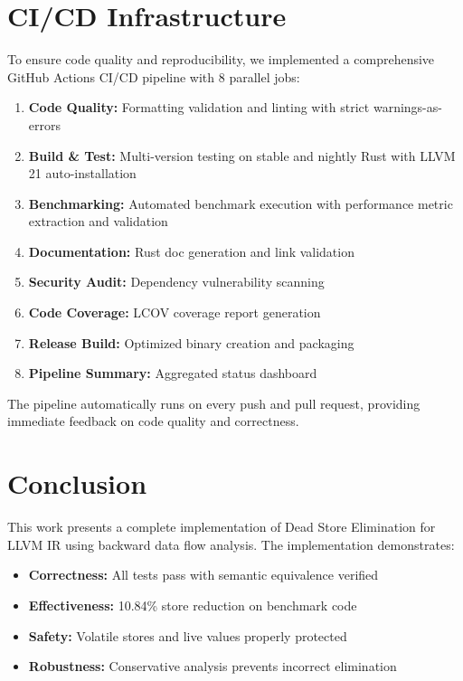 \documentclass[journal]{IEEEtran}
\begin{document}
\section{CI/CD Infrastructure}

To ensure code quality and reproducibility, we implemented a comprehensive GitHub Actions CI/CD pipeline with 8 parallel jobs:

\begin{enumerate}
\item \textbf{Code Quality:} Formatting validation and linting with strict warnings-as-errors
\item \textbf{Build \& Test:} Multi-version testing on stable and nightly Rust with LLVM 21 auto-installation
\item \textbf{Benchmarking:} Automated benchmark execution with performance metric extraction and validation
\item \textbf{Documentation:} Rust doc generation and link validation
\item \textbf{Security Audit:} Dependency vulnerability scanning
\item \textbf{Code Coverage:} LCOV coverage report generation
\item \textbf{Release Build:} Optimized binary creation and packaging
\item \textbf{Pipeline Summary:} Aggregated status dashboard
\end{enumerate}

The pipeline automatically runs on every push and pull request, providing immediate feedback on code quality and correctness.

\section{Conclusion}

This work presents a complete implementation of Dead Store Elimination for LLVM IR using backward data flow analysis. The implementation demonstrates:

\begin{itemize}
\item \textbf{Correctness:} All tests pass with semantic equivalence verified
\item \textbf{Effectiveness:} 10.84\% store reduction on benchmark code
\item \textbf{Safety:} Volatile stores and live values properly protected
\item \textbf{Robustness:} Conservative analysis prevents incorrect elimination
\end{itemize}
\end{document}
